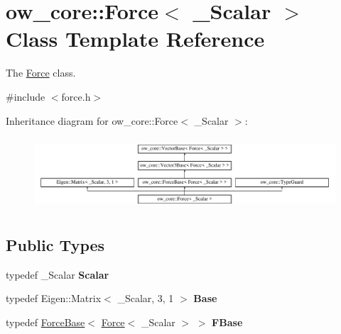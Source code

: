 \hypertarget{classow__core_1_1Force}{}\section{ow\+\_\+core\+:\+:Force$<$ \+\_\+\+Scalar $>$ Class Template Reference}
\label{classow__core_1_1Force}


The \hyperlink{classow__core_1_1Force}{Force} class.  




{\ttfamily \#include $<$force.\+h$>$}

Inheritance diagram for ow\+\_\+core\+:\+:Force$<$ \+\_\+\+Scalar $>$\+:\begin{figure}[H]
\begin{center}
\leavevmode
\includegraphics[height=2.725061cm]{d5/d29/classow__core_1_1Force}
\end{center}
\end{figure}
\subsection*{Public Types}
\begin{DoxyCompactItemize}
\item 
typedef \+\_\+\+Scalar {\bfseries Scalar}\hypertarget{classow__core_1_1Force_a551a42903f5645dd058650d0205586bf}{}\label{classow__core_1_1Force_a551a42903f5645dd058650d0205586bf}

\item 
typedef Eigen\+::\+Matrix$<$ \+\_\+\+Scalar, 3, 1 $>$ {\bfseries Base}\hypertarget{classow__core_1_1Force_a1bb7032b4369272173570662e7a6bbb7}{}\label{classow__core_1_1Force_a1bb7032b4369272173570662e7a6bbb7}

\item 
typedef \hyperlink{classow__core_1_1ForceBase}{Force\+Base}$<$ \hyperlink{classow__core_1_1Force}{Force}$<$ \+\_\+\+Scalar $>$ $>$ {\bfseries F\+Base}\hypertarget{classow__core_1_1Force_a2a1f96ede75e7abd79849edc1a2242f6}{}\label{classow__core_1_1Force_a2a1f96ede75e7abd79849edc1a2242f6}

\end{DoxyCompactItemize}
